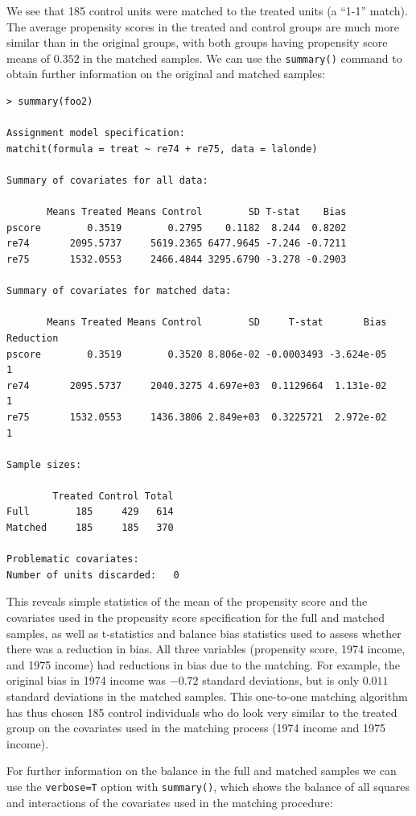 \documentclass[oneside,letterpaper,titlepage]{article}
\begin{document}
We see that 185 control units were matched to the treated units (a ``1-1'' match).  The average propensity scores in the treated and control
groups are much more similar than in the original groups, with both groups having propensity score means of $0.352$ in the matched samples.  We
can use the {\tt summary()} command to obtain further information on the original and matched samples:

\begin{verbatim}
> summary(foo2)
 
Assignment model specification:
matchit(formula = treat ~ re74 + re75, data = lalonde)
 
Summary of covariates for all data:
 
       Means Treated Means Control        SD T-stat    Bias
pscore        0.3519        0.2795    0.1182  8.244  0.8202
re74       2095.5737     5619.2365 6477.9645 -7.246 -0.7211
re75       1532.0553     2466.4844 3295.6790 -3.278 -0.2903
 
Summary of covariates for matched data:
 
       Means Treated Means Control        SD     T-stat       Bias Reduction
pscore        0.3519        0.3520 8.806e-02 -0.0003493 -3.624e-05         1
re74       2095.5737     2040.3275 4.697e+03  0.1129664  1.131e-02         1
re75       1532.0553     1436.3806 2.849e+03  0.3225721  2.972e-02         1
 
Sample sizes:
 
        Treated Control Total
Full        185     429   614
Matched     185     185   370
 
Problematic covariates:
Number of units discarded:   0
\end{verbatim}

This reveals simple statistics of the mean of the propensity score and the covariates used in the propensity score specification for
the full and matched samples, as well as t-statistics and balance bias
statistics used to assess whether there was a reduction in bias. 
All three variables (propensity score, 1974 income, and 1975 income) had reductions in bias due to the matching.  For example, the original
bias in 1974 income was $-0.72$ standard deviations, but is only $0.011$ standard deviations in the matched samples. 
This one-to-one matching algorithm has thus chosen 185 control individuals who do look very similar to the treated group on the covariates used in the
matching process (1974 income and 1975 income).  

For further information on the balance in the full and matched samples we can use the {\tt verbose=T} option with {\tt summary()}, which shows the balance
of all squares and interactions of the covariates used in the matching procedure:
\end{document}
